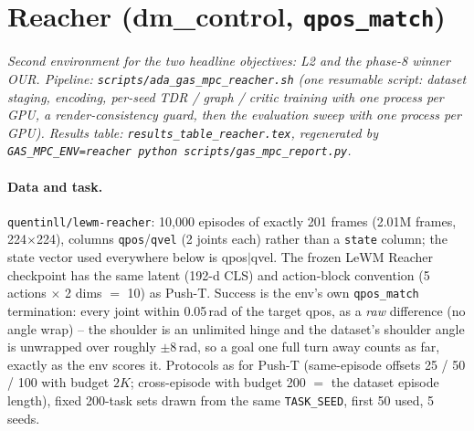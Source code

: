 \documentclass[11pt]{article}
\begin{document}
\section{Reacher (dm\_control, \texttt{qpos\_match})}
\label{sec:reacher}
\emph{Second environment for the two headline objectives: L2 and the phase-8 winner OUR.
Pipeline: \texttt{scripts/ada\_gas\_mpc\_reacher.sh} (one resumable script: dataset staging,
encoding, per-seed TDR / graph / critic training with one process per GPU, a render-consistency
guard, then the evaluation sweep with one process per GPU). Results table:
\texttt{results\_table\_reacher.tex}, regenerated by \texttt{GAS\_MPC\_ENV=reacher python
scripts/gas\_mpc\_report.py}.}

\paragraph{Data and task.} \texttt{quentinll/lewm-reacher}: 10,000 episodes of exactly 201
frames (2.01M frames, 224$\times$224), columns \texttt{qpos}/\texttt{qvel} (2 joints each)
rather than a \texttt{state} column; the state vector used everywhere below is qpos$|$qvel.
The frozen LeWM Reacher checkpoint has the same latent (192-d CLS) and action-block
convention (5 actions $\times$ 2 dims $=$ 10) as Push-T. Success is the env's own
\texttt{qpos\_match} termination: every joint within 0.05\,rad of the target qpos, as a
\emph{raw} difference (no angle wrap) -- the shoulder is an unlimited hinge and the dataset's
shoulder angle is unwrapped over roughly $\pm 8$\,rad, so a goal one full turn away counts as
far, exactly as the env scores it. Protocols as for Push-T (same-episode offsets 25 / 50 / 100
with budget $2K$; cross-episode with budget 200 $=$ the dataset episode length), fixed
200-task sets drawn from the same \texttt{TASK\_SEED}, first 50 used, 5 seeds.
\end{document}
